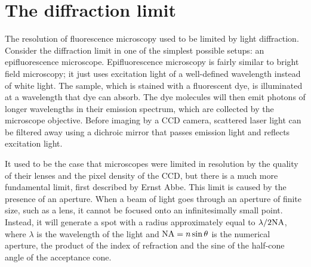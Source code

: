 \section{The diffraction limit}

The resolution of fluorescence microscopy used to be limited by light diffraction. Consider the diffraction limit in one of the simplest possible setups: an epifluorescence microscope. Epifluorescence microscopy is fairly similar to bright field microscopy; it just uses excitation light of a well-defined wavelength instead of white light. The sample, which is stained with a fluorescent dye, is illuminated at a wavelength that dye can absorb. The dye molecules will then emit photons of longer wavelengths in their emission spectrum, which are collected by the microscope objective. Before imaging by a CCD camera, scattered laser light can be filtered away using a dichroic mirror that passes emission light and reflects excitation light. 


It used to be the case that microscopes were limited in resolution by the quality of their lenses and the pixel density of the CCD, but there is a much more fundamental limit, first described by Ernst Abbe. This limit is caused by the presence of an aperture. When a beam of light goes through an aperture of finite size, such as a lens, it cannot be focused onto an infinitesimally small point. Instead, it will generate a spot with a radius approximately equal to $ \lambda/2\mathrm{NA} $, where $ \lambda $ is the wavelength of the light and $ \mathrm{NA}= n\sin\theta $ is the numerical aperture, the product of the index of refraction and the sine of the half-cone angle of the acceptance cone.

